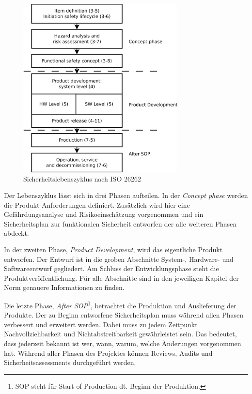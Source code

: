 \documentclass[
  a4paper,					    %
  twoside,
  DIV=calc,     				%
  bibliography=totoc,
  cleardoublepage=empty,
  ngerman,     					%
  final       					%
]{scrbook}
\begin{document}
\begin{figure}[!htbp]
\center
\includegraphics[width=0.75\textwidth]{ISO_26262_Lifecycle}
\caption[Sicherheitslebenszyklus nach ISO 26262]{Sicherheitslebenszyklus nach ISO 26262\cite{iso26262}}
\label{fig:lifecycle}
\end{figure}

Der Lebenszyklus lässt sich in drei Phasen aufteilen. In der \emph{Concept phase} werden die Produkt-Anforderungen definiert. Zusätzlich wird hier eine Gefährdungsanalyse und Risikoeinschätzung vorgenommen und ein Sicherheitsplan zur funktionalen Sicherheit entworfen der alle weiteren Phasen abdeckt.

In der zweiten Phase, \emph{Product Development}, wird das eigentliche Produkt entworfen. Der Entwurf ist in die groben Abschnitte System-, Hardware- und Softwareentwurf gegliedert. Am Schluss der Entwicklungsphase steht die Produktveröffentlichung. Für alle Abschnitte sind in den jeweiligen Kapitel der Norm genauere Informationen zu finden.

Die letzte Phase, \emph{After SOP}\footnote{SOP steht für Start of Production dt. Beginn der Produktion.}, betrachtet die Produktion und Auslieferung der Produkte. Der zu Beginn entworfene Sicherheitsplan muss während allen Phasen verbessert und erweitert werden. Dabei muss zu jedem Zeitpunkt Nachvollziehbarkeit und Nichtabstreitbarkeit gewährleistet sein. Das bedeutet, dass jederzeit bekannt ist wer, wann, warum, welche Änderungen vorgenommen hat. Während aller Phasen des Projektes können Reviews, Audits und Sicherheitsassessments durchgeführt werden.
\end{document}

